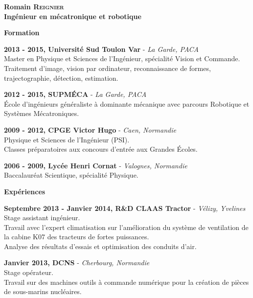 \documentclass[a4paper,11pt,final]{memoir}
\newcommand{\Sep}{\vspace{1.5em}}
\newcommand{\SmallSep}{\vspace{0.5em}}
\newenvironment{AboutMe}
	{\ignorespaces}%
	{\SmallSep\ignorespacesafterend}
\newcommand{\CVSection}[1]
	{\Large\textbf{#1}\par
	\SmallSep\normalsize\normalfont}
\newcommand{\CVItem}[2]
	{\textbf{\color{RoyalBlue} #1 \color{dark_gray} #2}\normalsize\normalfont}
\newcommand{\city}[1]
	{{\small\color{dark_gray}\emph{#1}}\normalsize\normalfont}
\begin{document}
\Huge\bfseries {\color{RoyalBlue} Romain \textsc{Reignier}} \\
\Large\bfseries  Ingénieur en mécatronique et robotique\\

\normalsize\normalfont

\begin{AboutMe}
\end{AboutMe}

\CVSection{Formation}

\CVItem{2013 - 2015,}{Université Sud Toulon Var} - \city{La Garde, PACA}\\
Master en Physique et Sciences de l'Ingénieur, spécialité Vision et Commande.\\
Traitement d'image, vision par ordinateur, reconnaissance de formes, trajectographie, détection, estimation.
\SmallSep

\CVItem{2012 - 2015,}{SUPMÉCA} - \city{La Garde, PACA}\\
École d'ingénieurs généraliste à dominante mécanique avec parcours Robotique et Systèmes Mécatroniques.
\SmallSep

\CVItem{2009 - 2012,}{CPGE Victor Hugo} - \city{Caen, Normandie}\\
Physique et Sciences de l'Ingénieur (PSI).\\
Classes préparatoires aux concours d'entrée aux Grandes Écoles.
\SmallSep

\CVItem{2006 - 2009,}{Lycée Henri Cornat} - \city{Valognes, Normandie}\\
Baccalauréat Scientique, spécialité Physique.
\Sep

\CVSection{Expériences}

\CVItem{Septembre 2013 - Janvier 2014,}{R\&D CLAAS Tractor} - \city{Vélizy, Yvelines}\\
Stage assistant ingénieur.\\
Travail avec l'expert climatisation sur l'amélioration du système de ventilation de la cabine K07 des tracteurs de fortes puissances.\\
Analyse des résultats d'essais et optimisation des conduits d'air.
\SmallSep

\CVItem{Janvier 2013,}{DCNS} - \city{Cherbourg, Normandie}\\
Stage opérateur.\\
Travail sur des machines outils à commande numérique pour la création de pièces de sous-marins nucléaires.
\SmallSep
\end{document}
